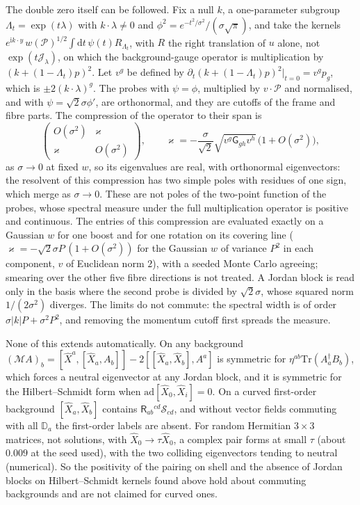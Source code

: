 The double zero itself can be followed. Fix a null \(k\), a one-parameter subgroup \(\Lambda_t=\exp(t\lambda)\) with \(k\cdot\lambda\neq0\) and \(\phi^2=e^{-t^2/\sigma^2}/(\sigma\sqrt\pi)\), and take the kernels \(e^{\mathrm ik\cdot y}\,w(\mathcal P)^{1/2}\int\mathrm dt\,\psi(t)R_{\Lambda_t}\), with \(R\) the right translation of \(u\) alone, not \(\exp(t\mathcal J_\lambda)\), on which the background-gauge operator is multiplication by \((k+(1-\Lambda_t)p)^2\). Let \(v^g\) be defined by \(\partial_t(k+(1-\Lambda_t)p)^2|_{t=0}=v^gp_g\), which is \(\pm2(k\cdot\lambda)^g\). The probes with \(\psi=\phi\), multiplied by \(v\cdot\mathcal P\) and normalised, and with \(\psi=\sqrt2\sigma\phi'\), are orthonormal, and they are cutoffs of the frame and fibre parts. The compression of the operator to their span is
\[
\begin{pmatrix}O(\sigma^2)&\varkappa\\\varkappa&O(\sigma^2)\end{pmatrix},\qquad
\varkappa=-\frac{\sigma}{\sqrt2}\sqrt{v^g\mathsf G_{gh}v^h}\,\bigl(1+O(\sigma^2)\bigr),
\]
as \(\sigma\to0\) at fixed \(w\), so its eigenvalues are real, with orthonormal eigenvectors: the resolvent of this compression has two simple poles with residues of one sign, which merge as \(\sigma\to0\). These are not poles of the two-point function of the probes, whose spectral measure under the full multiplication operator is positive and continuous. The entries of this compression are evaluated exactly on a Gaussian \(w\) for one boost and for one rotation on its covering line (\(\varkappa=-\sqrt2\sigma P\,(1+O(\sigma^2))\) for the Gaussian \(w\) of variance \(P^2\) in each component, \(v\) of Euclidean norm \(2\)), with a seeded Monte Carlo agreeing; smearing over the other five fibre directions is not treated. A Jordan block is read only in the basis where the second probe is divided by \(\sqrt2\sigma\), whose squared norm \(1/(2\sigma^2)\) diverges. The limits do not commute: the spectral width is of order \(\sigma|k|P+\sigma^2P^2\), and removing the momentum cutoff first spreads the measure.

None of this extends automatically. On any background \((\mathcal MA)_b=[\hat X^a,[\hat X_a,A_b]]-2[[\hat X_a,\hat X_b],A^a]\) is symmetric for \(\eta^{ab}\mathrm{Tr}(A_a^\dagger B_b)\), which forces a neutral eigenvector at any Jordan block, and it is symmetric for the Hilbert--Schmidt form when \(\mathrm{ad}[\hat X_0,\hat X_i]=0\). On a curved first-order background \([\hat X_a,\hat X_b]\) contains \(\mathsf R_{ab}{}^{cd}\mathcal S_{cd}\), and without vector fields commuting with all \(\mathbb D_a\) the first-order labels are absent. For random Hermitian \(3\times3\) matrices, not solutions, with \(\hat X_0\to\tau\hat X_0\), a complex pair forms at small \(\tau\) (about \(0.009\) at the seed used), with the two colliding eigenvectors tending to neutral (numerical). So the positivity of the pairing on shell and the absence of Jordan blocks on Hilbert--Schmidt kernels found above hold about commuting backgrounds and are not claimed for curved ones.

